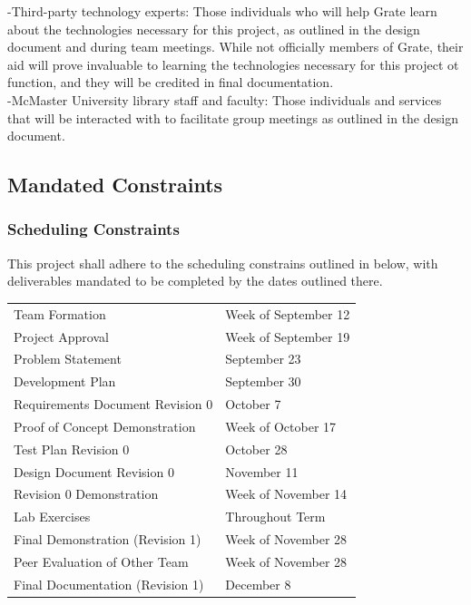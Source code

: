 \documentclass[12pt, titlepage]{article}
\begin{document}
-Third-party technology experts: Those individuals who will help Grate learn 
about the technologies necessary for this project, as outlined in the design 
document and during team meetings. While not officially members of Grate, their 
aid will prove invaluable to learning the technologies necessary for this 
project ot function, and they will be credited in final documentation.\\

-McMaster University library staff and faculty: Those individuals and services 
that will be interacted with to facilitate group meetings as outlined in the 
design document.

\subsection{Mandated Constraints}

\subsubsection{Scheduling Constraints}

This project shall adhere to the scheduling constrains outlined in below, with 
deliverables mandated to be completed by the dates outlined there.

\begin{tabular}{ p{6.7cm} l}

  Team Formation & Week of September 12\\

  Project Approval & Week of September 19\\

  Problem Statement & September 23\\

  Development Plan & September 30\\

  Requirements Document Revision 0 & October 7\\

  Proof of Concept Demonstration & Week of October 17\\

  Test Plan Revision 0 & October 28\\

  Design Document Revision 0 & November 11\\

  Revision 0 Demonstration & Week of November 14\\

  Lab Exercises & Throughout Term\\

  Final Demonstration (Revision 1) & Week of November 28\\

  Peer Evaluation of Other Team & Week of November 28\\

  Final Documentation (Revision 1) & December 8\\

\end{tabular}
\end{document}
